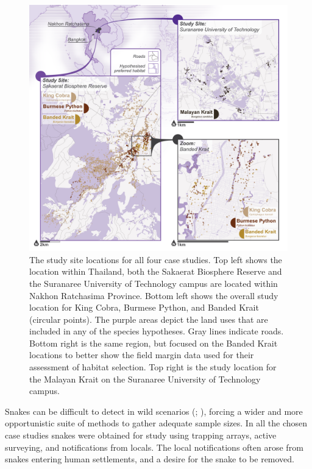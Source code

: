 \documentclass[10pt,a4paper]{article}
\begin{document}
\begin{figure}
\includegraphics[width=1\linewidth]{../ext_images/LocationMap} \caption{The study site locations for all four case studies. Top left shows the location within Thailand, both the Sakaerat Biosphere Reserve and the Suranaree University of Technology campus are located within Nakhon Ratchasima Province. Bottom left shows the overall study location for King Cobra, Burmese Python, and Banded Krait (circular points). The purple areas depict the land uses that are included in any of the species hypotheses. Gray lines indicate roads. Bottom right is the same region, but focused on the Banded Krait locations to better show the field margin data used for their assessment of habitat selection. Top right is the study location for the Malayan Krait on the Suranaree University of Technology campus.}\label{fig:locationFigure}
\end{figure}

Snakes can be difficult to detect in wild scenarios (; ), forcing a wider and more opportunistic suite of methods to gather adequate sample sizes.
In all the chosen case studies snakes were obtained for study using trapping arrays, active surveying, and notifications from locals.
The local notifications often arose from snakes entering human settlements, and a desire for the snake to be removed.
\end{document}
